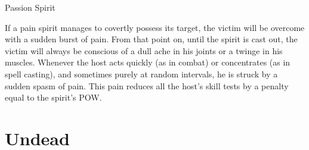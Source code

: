 \begin{monsterbox}{Passion Spirit}
\begin{rpg-monsteraction}
	\end{rpg-monsteraction}
	\begin{rpg-monsteraction}
		If a pain spirit manages to covertly possess its target, the victim will be overcome with a sudden burst of pain. From that point on, until the spirit is cast out, the victim will always be conscious of a dull ache in his joints or a twinge in his muscles. Whenever the host acts quickly (as in combat) or concentrates (as in spell casting), and sometimes purely at random intervals, he is struck by a sudden spasm of pain. This pain reduces all the host’s skill tests by a penalty equal to the spirit’s POW.
	\end{rpg-monsteraction}
\end{monsterbox}

\clearpage

\section{Undead}
\label{sec:undead}



